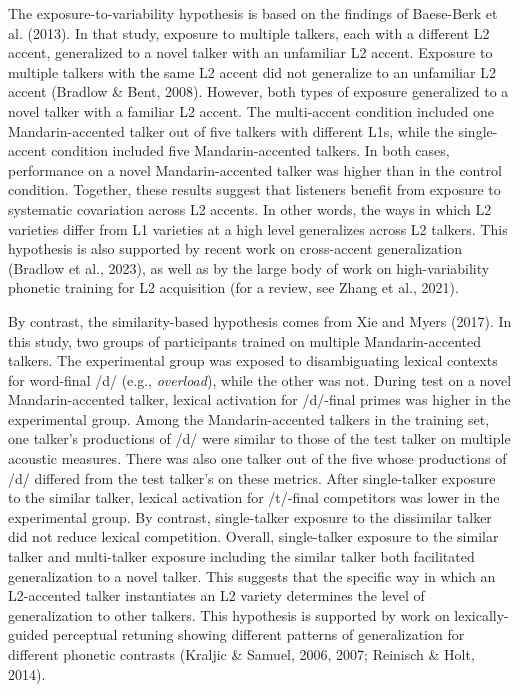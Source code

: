 \documentclass[
  12pt,
  twoside]{article}
\begin{document}
The exposure-to-variability hypothesis is based on the findings of Baese-Berk et al. (2013).
In that study, exposure to multiple talkers, each with a different L2 accent, generalized to a novel talker with an unfamiliar L2 accent.
Exposure to multiple talkers with the same L2 accent did not generalize to an unfamiliar L2 accent (Bradlow \& Bent, 2008).
However, both types of exposure generalized to a novel talker with a familiar L2 accent.
The multi-accent condition included one Mandarin-accented talker out of five talkers with different L1s, while the single-accent condition included five Mandarin-accented talkers.
In both cases, performance on a novel Mandarin-accented talker was higher than in the control condition.
Together, these results suggest that listeners benefit from exposure to systematic covariation across L2 accents.
In other words, the ways in which L2 varieties differ from L1 varieties at a high level generalizes across L2 talkers.
This hypothesis is also supported by recent work on cross-accent generalization (Bradlow et al., 2023), as well as by the large body of work on high-variability phonetic training for L2 acquisition (for a review, see Zhang et al., 2021).

By contrast, the similarity-based hypothesis comes from Xie and Myers (2017).
In this study, two groups of participants trained on multiple Mandarin-accented talkers.
The experimental group was exposed to disambiguating lexical contexts for word-final /d/ (e.g., \emph{overload}), while the other was not.
During test on a novel Mandarin-accented talker, lexical activation for /d/-final primes was higher in the experimental group.
Among the Mandarin-accented talkers in the training set, one talker's productions of /d/ were similar to those of the test talker on multiple acoustic measures.
There was also one talker out of the five whose productions of /d/ differed from the test talker's on these metrics.
After single-talker exposure to the similar talker, lexical activation for /t/-final competitors was lower in the experimental group.
By contrast, single-talker exposure to the dissimilar talker did not reduce lexical competition.
Overall, single-talker exposure to the similar talker and multi-talker exposure including the similar talker both facilitated generalization to a novel talker.
This suggests that the specific way in which an L2-accented talker instantiates an L2 variety determines the level of generalization to other talkers.
This hypothesis is supported by work on lexically-guided perceptual retuning showing different patterns of generalization for different phonetic contrasts (Kraljic \& Samuel, 2006, 2007; Reinisch \& Holt, 2014).
\end{document}
